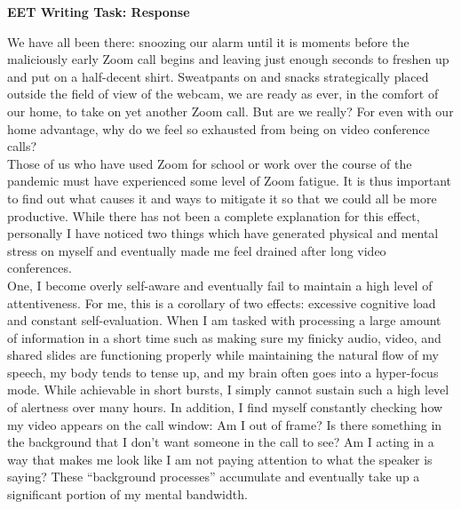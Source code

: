 \documentclass[12pt]{article}
\begin{document}
\newpage


\begin{center}
	\textbf{EET Writing Task: Response}
\end{center}


We have all been there: snoozing our alarm until it is moments before the maliciously early Zoom call begins and leaving just enough seconds to freshen up and put on a half-decent shirt. Sweatpants on and snacks strategically placed outside the field of view of the webcam, we are ready as ever, in the comfort of our home, to take on yet another Zoom call. But are we really? For even with our home advantage, why do we feel so exhausted from being on video conference calls?\\


Those of us who have used Zoom for school or work over the course of the pandemic must have experienced some level of Zoom fatigue. It is thus important to find out what causes it and ways to mitigate it so that we could all be more productive. While there has not been a complete explanation for this effect, personally I have noticed two things which have generated physical and mental stress on myself and eventually made me feel  drained after long video conferences. \\


One, I become overly self-aware and eventually fail to maintain a high level of attentiveness. For me, this is a corollary of two effects: excessive cognitive load and constant self-evaluation. When I am tasked with processing a large amount of information in a short time such as making sure my finicky audio, video, and shared slides are functioning properly while maintaining the natural flow of my speech, my body tends to tense up, and my brain often goes into a hyper-focus mode. While achievable in short bursts, I simply cannot sustain such a high level of alertness over many hours. In addition, I find myself constantly checking how my video appears on the call window: Am I out of frame? Is there something in the background that I don't want someone in the call to see? Am I acting in a way that makes me look like I am not paying attention to what the speaker is saying? These ``background processes'' accumulate and eventually take up a significant portion of my mental bandwidth. \\
\end{document}
